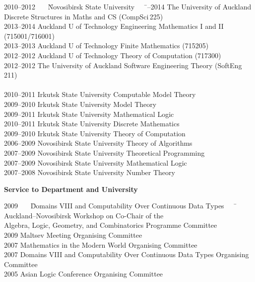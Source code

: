 \documentclass[12pt]{article}
\begin{document}
\begin{tabbing}
2010--2012 \ \ \ \= Novosibirsk State University \ \ \ \= --2014        \> The University of Auckland             \> Discrete Structures in Maths and CS (CompSci\,225)\\
2013--2014       \> Auckland U of Technology       \> Engineering Mathematics I and II (715001/716001)\\
2013--2013       \> Auckland U of Technology       \> Finite Mathematics (715205)\\
2012--2012       \> Auckland U of Technology        \> Theory of Computation (717300)\\
2012--2012       \> The University of Auckland              \> Software Engineering Theory (SoftEng\,211)\\
\\
2010--2011       \> Irkutsk State University              \> Computable Model Theory\\
2009--2010       \> Irkutsk State University              \> Model Theory\\
2009--2011       \> Irkutsk State University              \> Mathematical Logic\\
2010--2011       \> Irkutsk State University              \> Discrete Mathematics\\
2009--2010       \> Irkutsk State University              \> Theory of Computation\\
2006--2009       \> Novosibirsk State University       \> Theory of Algorithms\\
2007--2009       \> Novosibirsk State University       \> Theoretical Programming\\
2007--2009       \> Novosibirsk State University       \> Mathematical Logic\\
2007--2008       \> Novosibirsk State University       \> Number Theory\\
\end{tabbing}

\centerline{\bf Service to Department and University}
\begin{tabbing}
2009 \ \ \ \= Domains VIII and Computability Over Continuous Data Types \ \ \ \=           \> Auckland--Novosibirsk Workshop on       \> Co-Chair of the \\
              \> Algebra, Logic, Geometry, and Combinatorics      \> Programme Committee \\
2009          \> Maltsev Meeting                          \> Organising Committee\\
2007          \> Mathematics in the Modern World          \> Organising Committee\\
2007          \> Domains VIII and Computability Over Continuous Data Types     \> Organising Committee\\
2005          \> Asian Logic Conference                   \> Organising Committee\\
\end{tabbing}
\end{document}
